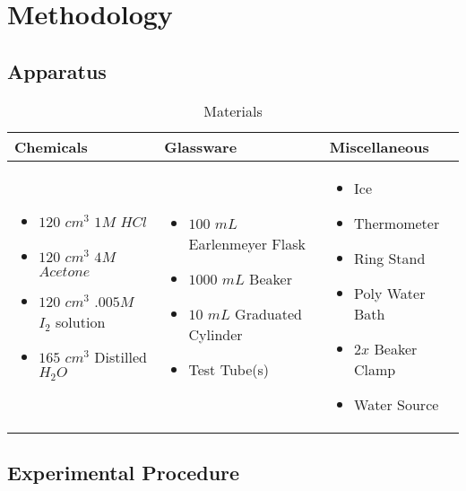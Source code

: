 \section{Methodology}

\subsection{Apparatus}

\begin{table}[h!]
\centering

\begin{tabular}{m{5cm} m{5cm} m{4cm}} 
 \toprule
 Chemicals & Glassware & Miscellaneous \\
 \midrule
	\begin{itemize}[]
	  \item $120$ $cm^3$ $1 M$ $HCl$
	  \item $120$ $cm^3$ $4 M$ $Acetone$
	  \item $120$ $cm^3$ $.005 M$ $I_2$ solution 
	  \item $165$ $cm^3$ Distilled $H_2O$
	\end{itemize} & 
	\begin{itemize}[]
	  \item $100$ $mL$ Earlenmeyer Flask
	  \item $1000$ $mL$ Beaker
	  \item $10$ $mL$ Graduated Cylinder
	  \item Test Tube(s)
	\end{itemize} & 
	\begin{itemize}[]
	  \item Ice
	  \item Thermometer
	  \item Ring Stand
	  \item Poly Water Bath
	  \item $2x$ Beaker Clamp
	  \item Water Source
	\end{itemize} \\
  \bottomrule
\end{tabular}
\caption{Materials}
\label{table:apparatus}
\end{table}

\subsection{Experimental Procedure}
